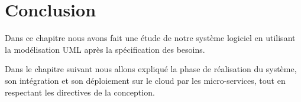    \section{Conclusion}
   
   Dans ce chapitre nous avons fait une étude de notre système logiciel en utilisant la modélisation UML après la spécification des besoins. 
     
        Dans le chapitre suivant nous allons expliqué la phase de réalisation du système, son intégration et son déploiement sur le  cloud par les micro-services, tout en respectant les directives de la conception.
    
    